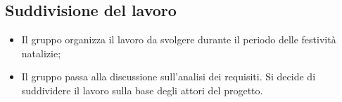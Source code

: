 \documentclass[11pt,a4paper]{article}
\begin{document}
	\subsection{Suddivisione del lavoro}
	\begin{itemize}
		\item Il gruppo organizza il lavoro da svolgere durante il periodo delle festività natalizie;
		\item Il gruppo passa alla discussione sull'analisi dei requisiti. Si decide di suddividere il lavoro sulla base degli attori del progetto.
	\end{itemize}
\end{document}
